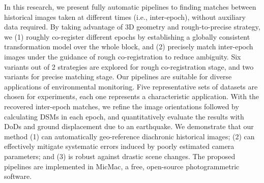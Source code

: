 \documentclass[a4paper,11pt,twoside]{ThesisStyle}
\begin{document}
In this research, we present fully automatic pipelines to finding matches between historical images taken at different times (i.e., inter-epoch), without auxiliary data required. 
By taking advantage of 3D geometry and rough-to-precise strategy, we (1) roughly co-register different epochs by establishing a globally consistent transformation model over the whole block, and (2) precisely match inter-epoch images under the guidance of rough co-registration to reduce ambiguity. Six variants out of 2 strategies are explored for rough co-registration stage, and two variants for precise matching stage. 
Our pipelines are suitable for diverse applications of environmental monitoring. Five representative sets of datasets are chosen for experiments, each one represents a characteristic application. 
With the recovered inter-epoch matches, we refine the image orientations followed by calculating \ac{DSM}s in each epoch, and quantitatively evaluate the results with \ac{DoD}s and ground displacement due to an earthquake. We demonstrate that our method (1) can automatically geo-reference diachronic historical images; (2) can effectively mitigate systematic errors induced by poorly estimated camera parameters; and (3) is robust against drastic scene changes. 
The proposed pipelines are implemented in MicMac, a free, open-source photogrammetric software.\\


\end{document}
